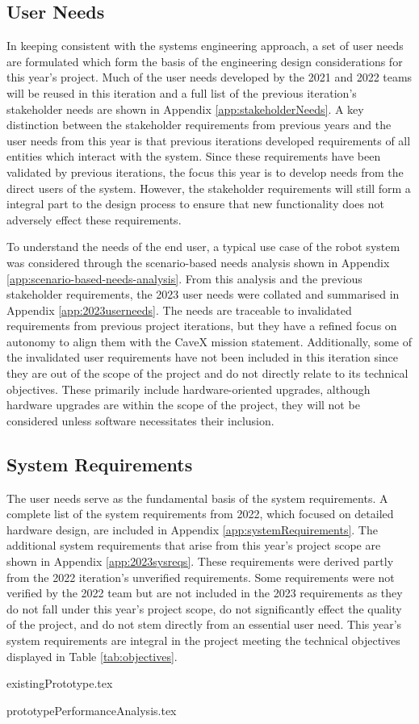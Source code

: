 \subsection{User Needs}
In keeping consistent with the systems engineering approach, a set of user needs are formulated which form the basis of the engineering design considerations for this year's project. Much of the user needs developed by the 2021 and 2022 teams will be reused in this iteration and a full list of the previous iteration's stakeholder needs are shown in Appendix \ref{app:stakeholderNeeds}. A key distinction between the stakeholder requirements from previous years and the user needs from this year is that previous iterations developed requirements of all entities which interact with the system. Since these requirements have been validated by previous iterations, the focus this year is to develop needs from the direct users of the system. However, the stakeholder requirements will still form a integral part to the design process to ensure that new functionality does not adversely effect these requirements.

To understand the needs of the end user, a typical use case of the robot system was considered through the scenario-based needs analysis shown in Appendix \ref{app:scenario-based-needs-analysis}. From this analysis and the previous stakeholder requirements, the 2023 user needs were collated and summarised in Appendix \ref{app:2023userneeds}. The needs are traceable to invalidated requirements from previous project iterations, but they have a refined focus on autonomy to align them with the CaveX mission statement. Additionally, some of the invalidated user requirements have not been included in this iteration since they are out of the scope of the project and do not directly relate to its technical objectives. These primarily include hardware-oriented upgrades, although hardware upgrades are within the scope of the project, they will not be considered unless software necessitates their inclusion.

\subsection{System Requirements}
The user needs serve as the fundamental basis of the system requirements. A complete list of the system requirements from 2022, which focused on detailed hardware design, are included in Appendix \ref{app:systemRequirements}. The additional system requirements that arise from this year's project scope are shown in Appendix \ref{app:2023sysreqs}. These requirements were derived partly from the 2022 iteration's unverified requirements. Some requirements were not verified by the 2022 team but are not included in the 2023 requirements as they do not fall under this year's project scope, do not significantly effect the quality of the project, and do not stem directly from an essential user need. This year's system requirements are integral in the project meeting the technical objectives displayed in Table \ref{tab:objectives}.

{existingPrototype.tex}

{prototypePerformanceAnalysis.tex}